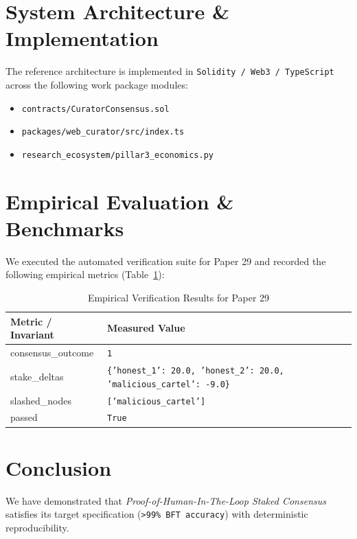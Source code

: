 \documentclass[10pt,twocolumn]{article}
\begin{document}
\section{System Architecture \& Implementation}
The reference architecture is implemented in \texttt{Solidity / Web3 / TypeScript} across the following work package modules:
\begin{itemize}
  \item \texttt{contracts/CuratorConsensus.sol}
  \item \texttt{packages/web\_curator/src/index.ts}
  \item \texttt{research\_ecosystem/pillar3\_economics.py}
\end{itemize}

\section{Empirical Evaluation \& Benchmarks}
We executed the automated verification suite for Paper 29 and recorded the following empirical metrics (Table~\ref{tab:metrics}):

\begin{table}[htbp]
\centering
\caption{Empirical Verification Results for Paper 29}
\label{tab:metrics}
\begin{tabular}{ll}
\toprule
\textbf{Metric / Invariant} & \textbf{Measured Value} \\
\midrule
    consensus\_outcome & \texttt{1} \\
    stake\_deltas & \texttt{\{'honest\_1': 20.0, 'honest\_2': 20.0, 'malicious\_cartel': -9.0\}} \\
    slashed\_nodes & \texttt{['malicious\_cartel']} \\
    passed & \texttt{True} \\
\bottomrule
\end{tabular}
\end{table}

\section{Conclusion}
We have demonstrated that \textit{Proof-of-Human-In-The-Loop Staked Consensus} satisfies its target specification (\texttt{>99\% BFT accuracy}) with deterministic reproducibility.



\end{document}
